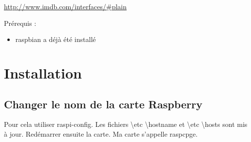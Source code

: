 \documentclass[10pt]{article}
\begin{document}

\vspace{.5cm}

\begin{savoir}

\end{savoir}



\setlength{\parskip}{0ex plus 0.2ex minus 0ex}
 \renewcommand{\contentsname}{}
 \renewcommand{\baselinestretch}{1}

\tableofcontents

 \renewcommand{\baselinestretch}{1.2}
\setlength{\parskip}{2ex plus 0.5ex minus 0.2ex}


\url{http://www.imdb.com/interfaces/#plain}

Prérequis : 
\begin{itemize}
\item raspbian a déjà été installé
\end{itemize}


\section{Installation}
\subsection{Changer le nom de la carte Raspberry}
Pour cela utiliser raspi-config. 
Les fichiers \textbackslash etc \textbackslash hostname et 
\textbackslash etc \textbackslash hosts sont mis à jour. Redémarrer ensuite la carte.
Ma carte s'appelle raspcpge.	 
 
\end{document}

